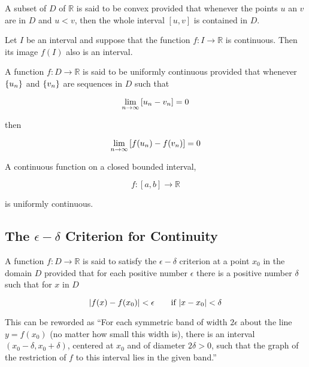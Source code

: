 \begin{definition}
    A subset of $D$ of $\mathbb{R}$ is said to be convex provided that whenever the points $u$ an $v$ are in $D$ and $u
    < v$, then the whole interval $[u, v]$ is contained in $D$.
\end{definition}

\begin{thm}
    Let $I$ be an interval and suppose that the function $f:I\to\mathbb{R}$ is continuous. Then its image $f(I)$ also is
    an interval.
\end{thm}

\begin{definition}
    A function $f:D\to\mathbb{R}$ is said to be uniformly continuous provided that whenever ${\left\{ u_n \right\}}$ and
    ${\left\{ v_n \right\}}$ are sequences in $D$ such that

    \[
        \lim_{n\to\infty} {\left[ u_n - v_n \right]} = 0
    \]

    then

    \[
        \lim_{n\to\infty} {\left[ f(u_n) - f(v_n) \right]} = 0
    \]
\end{definition}

\begin{thm}
    A continuous function on a closed bounded interval,

    \[
        f:[a, b] \to\mathbb{R}
    \]

    is uniformly continuous.
\end{thm}

    \subsection{The $\epsilon-\delta$ Criterion for Continuity}
    \begin{definition}
        A function $f:D\to\mathbb{R}$ is said to satisfy the $\epsilon-\delta$ criterion at a point $x_0$ in the domain
        $D$ provided that for each positive number $\epsilon$ there is a positive number $\delta$ such that for $x$ in
        $D$

        \[
            {\left\lvert f(x) - f(x_0) \right\rvert} < \epsilon \qquad \text{if } {\left\lvert x - x_0 \right\rvert} < \delta
        \]

        This can be reworded as ``For each symmetric band of width $2\epsilon$ about the line $y=f(x_0)$ (no matter how
        small this width is), there is an interval $(x_0-\delta,x_0+\delta)$, centered at $x_0$ and of diameter $2\delta
        > 0$, such that the graph of the restriction of $f$ to this interval lies in the given band.''
    \end{definition}

